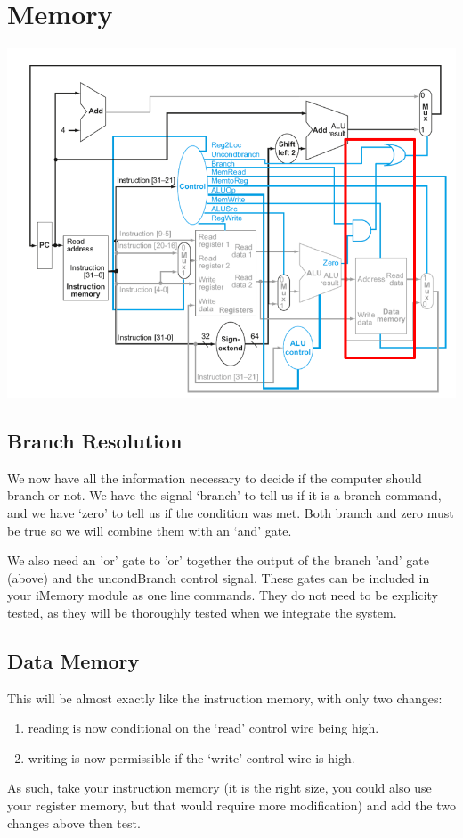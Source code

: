 \chapter{Memory}

\begin{center}
\includegraphics[width=5.5in]{../images/data_memory.png}
\end{center}


\section{Branch Resolution}

We now have all the information necessary to decide if the computer should branch or not.  We have the signal `branch' to tell us if it is a branch command, and we have `zero' to tell us if the condition was met.  Both branch and zero must be true so we will combine them with an `and' gate.

We also need an 'or' gate to 'or' together the output of the branch 'and' gate (above) and the uncondBranch control signal.  These gates can be included in your iMemory module as one line commands.  They do not need to be explicity tested, as they will be thoroughly tested when we integrate the system.  

\section{Data Memory}

This will be almost exactly like the instruction memory, with only two changes:
\begin{enumerate}
\item reading is now conditional on the `read' control wire being high.
\item writing is now permissible if the `write' control wire is high.
\end{enumerate}
As such, take your instruction memory (it is the right size, you could also use your register memory, but that would require more modification) and add the two changes above then test.

